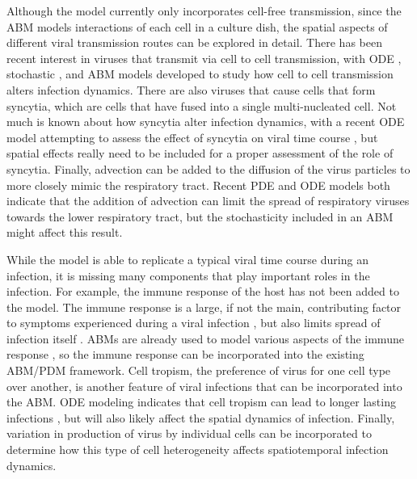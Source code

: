 Although the model currently only incorporates cell-free transmission, since the ABM models interactions of each cell in a culture dish, the spatial aspects of different viral transmission routes can be explored in detail. There has been recent interest in viruses that transmit via cell to cell transmission, with ODE \citep{allen15,komarova13,iwami15}, stochastic \citep{graw15}, and ABM \citep{kumberger18,blahut21} models developed to study how cell to cell transmission alters infection dynamics. There are also viruses that cause cells that form syncytia, which are cells that have fused into a single multi-nucleated cell. Not much is known about how syncytia alter infection dynamics, with a recent ODE model attempting to assess the effect of syncytia on viral time course \citep{jessie21}, but spatial effects really need to be included for a proper assessment of the role of syncytia. Finally, advection can be added to the diffusion of the virus particles to more closely mimic the respiratory tract. Recent PDE \citep{quirouette20} and ODE \citep{gonzalez19} models both indicate that the addition of advection can limit the spread of respiratory viruses towards the lower respiratory tract, but the stochasticity included in an ABM might affect this result. 

While the model is able to replicate a typical viral time course during an infection, it is missing many components that play important roles in the infection. For example, the immune response of the host has not been added to the model. The immune response is a large, if not the main, contributing factor to symptoms experienced during a viral infection \citep{manchanda14,zheng18}, but also limits spread of infection itself \citep{dobrovolny13}. ABMs are already used to model various aspects of the immune response \citep{whitman20,kerepesi19,levin16}, so the immune response can be incorporated into the existing ABM/PDM framework. Cell tropism, the preference of virus for one cell type over another, is another feature of viral infections that can be incorporated into the ABM. ODE modeling indicates that cell tropism can lead to longer lasting infections \citep{dobrovolny10}, but will also likely affect the spatial dynamics of infection. Finally, variation in production of virus by individual cells \citep{timm12} can be incorporated to determine how this type of cell heterogeneity affects spatiotemporal infection dynamics.


